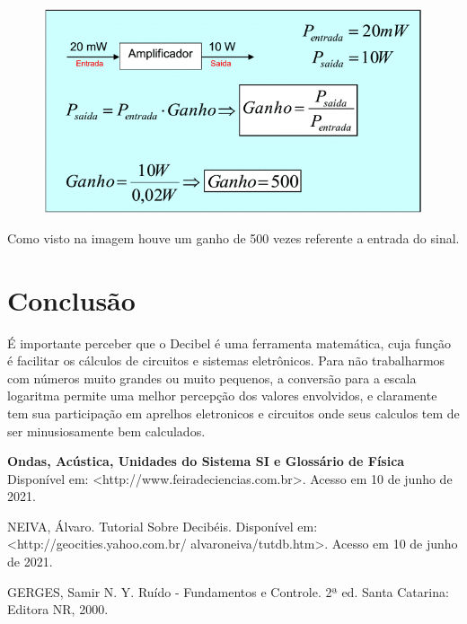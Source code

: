 \documentclass{article}
\begin{document}
\begin{figure}[h!]
\centering
\includegraphics[width=12cm]{formula.png}
\label{fig:formula}
\end{figure}


Como visto na imagem houve um ganho de 500 vezes referente a entrada do sinal.



\section{Conclusão}

É importante perceber que o Decibel é uma ferramenta matemática, cuja função é facilitar os cálculos de circuitos e sistemas eletrônicos. Para não trabalharmos com números muito grandes ou muito pequenos, a conversão para a escala logaritma permite uma melhor percepção dos valores envolvidos, e claramente tem sua participação em aprelhos eletronicos e circuitos onde seus calculos tem de ser minusiosamente bem calculados.




\textbf{Ondas, Acústica, Unidades do Sistema SI e Glossário de Física} Disponível em:
<http://www.feiradeciencias.com.br>. Acesso em 10 de junho de 2021.

NEIVA, Álvaro. Tutorial Sobre Decibéis. Disponível em: <http://geocities.yahoo.com.br/
alvaroneiva/tutdb.htm>. Acesso em 10 de junho de 2021.

GERGES, Samir N. Y. Ruído - Fundamentos e Controle. 2ª ed. Santa Catarina: Editora NR, 2000.


 

 
\end{document}
